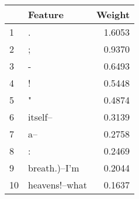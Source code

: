 \begin{tabular}{llr}
\toprule
{} &         Feature &  Weight \\
\midrule
1  &               . &  1.6053 \\
2  &               ; &  0.9370 \\
3  &               - &  0.6493 \\
4  &               ! &  0.5448 \\
5  &               " &  0.4874 \\
6  &        itself-- &  0.3139 \\
7  &             a-- &  0.2758 \\
8  &               : &  0.2469 \\
9  &   breath.)--I'm &  0.2044 \\
10 &  heavens!--what &  0.1637 \\
\bottomrule
\end{tabular}
